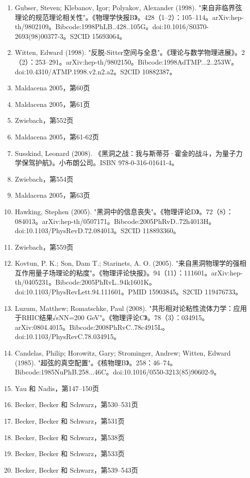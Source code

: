 \begin{enumerate}
\item Gubser, Steven; Klebanov, Igor; Polyakov, Alexander (1998). "来自非临界弦理论的规范理论相关性"。《物理学快报B》。428（1–2）：105–114。arXiv:hep-th/9802109。Bibcode:1998PhLB..428..105G。doi:10.1016/S0370-2693(98)00377-3。S2CID 15693064。  
\item Witten, Edward (1998). "反脱-Sitter空间与全息"。《理论与数学物理进展》。2（2）：253–291。arXiv:hep-th/9802150。Bibcode:1998AdTMP...2..253W。doi:10.4310/ATMP.1998.v2.n2.a2。S2CID 10882387。  
\item Maldacena 2005，第60页  
\item Maldacena 2005，第61页  
\item Zwiebach，第552页  
\item Maldacena 2005，第61-62页  
\item Susskind, Leonard (2008). 《黑洞之战：我与斯蒂芬·霍金的战斗，为量子力学保驾护航》。小布朗公司。ISBN 978-0-316-01641-4。
\item Zwiebach，第554页  
\item Maldacena 2005，第63页  
\item Hawking, Stephen (2005). "黑洞中的信息丧失"。《物理评论D》。72（8）：084013。arXiv:hep-th/0507171。Bibcode:2005PhRvD..72h4013H。doi:10.1103/PhysRevD.72.084013。S2CID 118893360。  
\item Zwiebach，第559页  
\item Kovtun, P. K.; Son, Dam T.; Starinets, A. O. (2005). "来自黑洞物理学的强相互作用量子场理论的粘度"。《物理评论快报》。94（11）：111601。arXiv:hep-th/0405231。Bibcode:2005PhRvL..94k1601K。doi:10.1103/PhysRevLett.94.111601。PMID 15903845。S2CID 119476733。  
\item Luzum, Matthew; Romatschke, Paul (2008). "共形相对论粘性流体力学：应用于RHIC结果√sNN=200 GeV"。《物理评论C》。78（3）：034915。arXiv:0804.4015。Bibcode:2008PhRvC..78c4915L。doi:10.1103/PhysRevC.78.034915。  
\item Candelas, Philip; Horowitz, Gary; Strominger, Andrew; Witten, Edward (1985). "超弦的真空配置"。《核物理B》。258：46–74。Bibcode:1985NuPhB.258...46C。doi:10.1016/0550-3213(85)90602-9。
\item Yau 和 Nadis，第147–150页  
\item Becker, Becker 和 Schwarz，第530–531页  
\item Becker, Becker 和 Schwarz，第531页  
\item Becker, Becker 和 Schwarz，第538页  
\item Becker, Becker 和 Schwarz，第533页  
\item Becker, Becker 和 Schwarz，第539–543页  

\end{enumerate}
